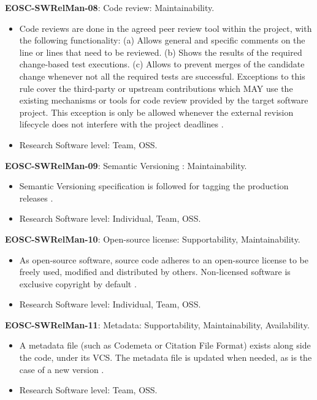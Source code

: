 \textbf{EOSC-SWRelMan-08}: Code review: Maintainability.

\begin{itemize}
    \item Code reviews are done in the agreed peer review tool within the project, with the following  functionality: (a) Allows general and specific comments on the line or lines that need to be reviewed. (b) Shows the results of the required change-based test executions. (c) Allows to prevent merges of the candidate change whenever not all the required tests are successful. Exceptions to this rule cover the third-party or upstream contributions which MAY use the existing mechanisms or tools for code review provided by the target software project. This exception is only be allowed whenever the external revision lifecycle does not interfere with the project deadlines \cite{srisopha_software_2018,aberdour_achieving_2007,zuser_software_2005,orviz_set_2017}.
    \item Research Software level: Team, OSS.
\end{itemize}

\textbf{EOSC-SWRelMan-09}: Semantic Versioning : Maintainability.

\begin{itemize}
    \item Semantic Versioning specification is followed for tagging the production releases \cite{orviz_set_2017,raymond_software_2013}.
    \item Research Software level: Individual, Team, OSS.
\end{itemize}

\textbf{EOSC-SWRelMan-10}: Open-source license: Supportability, Maintainability.

\begin{itemize}
    \item As open-source software, source code adheres to an open-source license to be freely used, modified and distributed by others. Non-licensed software is exclusive copyright by default \cite{orviz_set_2017,raymond_software_2013}.
    \item Research Software level: Individual, Team, OSS.
\end{itemize}

\textbf{EOSC-SWRelMan-11}: Metadata: Supportability, Maintainability, Availability.

\begin{itemize}
    \item A metadata file (such as Codemeta or Citation File Format) exists along side the code, under its VCS. The metadata file is updated when needed, as is the case of a new version \cite{orviz_set_2017}.
    \item Research Software level: Team, OSS.
\end{itemize}

